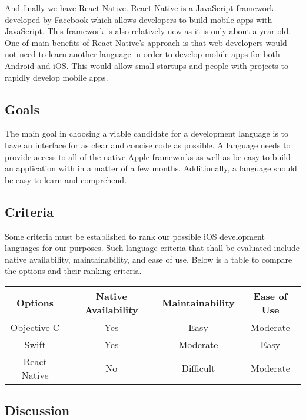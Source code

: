 \documentclass[letterpaper,10pt,titlepage]{article}
\begin{document}
And finally we have React Native. React Native is a JavaScript framework developed by Facebook which allows developers to build mobile apps with JavaScript. This framework is also relatively new as it is only about a year old. One of main benefits of React Native's approach is that web developers would not need to learn another language in order to develop mobile apps for both Android and iOS. This would allow small startups and people with projects to rapidly develop mobile apps.

\subsection{Goals}

The main goal in choosing a viable candidate for a development language is to have an interface for as clear and concise code as possible. A language needs to provide access to all of the native Apple frameworks as well as be easy to build an application with in a matter of a few months. Additionally, a language should be easy to learn and comprehend.\\

\subsection{Criteria}

Some criteria must be established to rank our possible iOS development languages for our purposes. Such language criteria that shall be evaluated include native availability, maintainability, and ease of use. Below is a table to compare the options and their ranking criteria.\\

\begin{center}
\begin{tabular}{ |c|c|c|c| }
 \hline
 Options & Native Availability & Maintainability & Ease of Use \\ \hline
 Objective C & Yes & Easy & Moderate \\ \hline
 Swift & Yes & Moderate & Easy \\ \hline
 React Native & No & Difficult & Moderate \\
 \hline
\end{tabular}
\end{center}

\subsection{Discussion}
\end{document}

